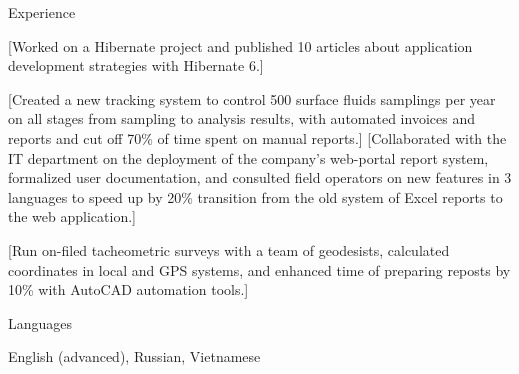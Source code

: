 \documentclass[10pt,a4paper,oneside]{letter} %
\begin{document}
	\begin{resumeSection}{Experience }

			[Worked on a Hibernate project and published 10 articles about application development strategies with Hibernate 6.]

			[Created a new tracking system to control 500 surface fluids samplings per year on all stages from sampling to analysis results, with automated invoices and reports and cut off 70\% of time spent on manual reports.]
			[Collaborated with the IT department on the deployment of the company's web-portal report system, formalized user documentation, and consulted field operators on new features in 3 languages to speed up by 20\% transition from the old system of Excel reports to the web application.]

			[Run on-filed tacheometric surveys with a team of geodesists, calculated coordinates in local and GPS systems, and enhanced time of preparing reposts by 10\% with AutoCAD automation tools.]
	\end{resumeSection}
	
	\begin{resumeSection}{Languages }

		English (advanced), Russian, Vietnamese
	\end{resumeSection}
	
\end{document}
